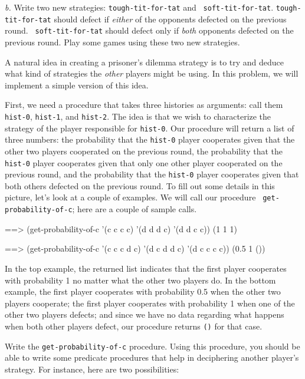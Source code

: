 {\it b.} Write two new strategies: {\tt tough-tit-for-tat} and {\tt
soft-tit-for-tat}. {\tt tough-tit-for-tat} should defect if {\it
either} of the opponents defected on the previous round.  {\tt
soft-tit-for-tat} should defect only if {\it both} opponents defected
on the previous round. Play some games using these two new strategies.

\goodbreak
\vskip 8pt


A natural idea in creating a prisoner's dilemma strategy is to
try and deduce what kind of strategies the {\it other} players might
be using. In this problem, we will implement a simple version of
this idea.

First, we need a procedure that takes three histories as arguments:
call them {\tt hist-0}, {\tt hist-1}, and {\tt hist-2}. The idea is
that we wish to characterize the strategy of the player responsible
for {\tt hist-0}. Our procedure will return a list of three numbers:
the probability that the {\tt hist-0} player cooperates given that the
other two players cooperated on the previous round, the probability
that the {\tt hist-0} player cooperates given that only one other
player cooperated on the previous round, and the probability that the
{\tt hist-0} player cooperates given that both others defected on the
previous round. To fill out some details in this picture, let's look
at a couple of examples. We will call our procedure {\tt
get-probability-of-c}; here are a couple of sample calls.

\beginlisp
==> (get-probability-of-c '(c c c c) '(d d d c) '(d d c c))
(1 1 1)

==> (get-probability-of-c '(c c c d c) '(d c d d c) '(d c c c c))
(0.5 1 ())
\endlisp

In the top example, the returned list indicates that the first player
cooperates with probability 1 no matter what the other two players do.
In the bottom example, the first player cooperates with probability
0.5 when the other two players cooperate; the first player cooperates
with probability 1 when one of the other two players defects; and
since we have no data regarding what happens when both other players
defect, our procedure returns {\tt ()} for that case.

Write the {\tt get-probability-of-c} procedure. Using this procedure,
you should be able to write some predicate procedures that help
in deciphering another player's strategy. For instance, here are
two possibilities:

